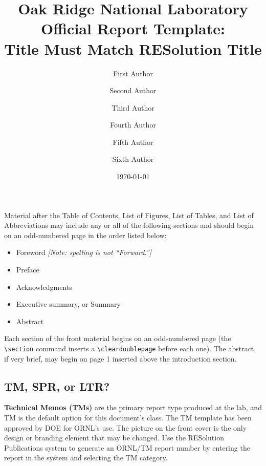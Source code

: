 \documentclass[tm]{ornltm} %
\author{First Author \and Second Author \and Third Author \and Fourth Author \and Fifth Author \and Sixth Author}
\title{Oak Ridge National Laboratory\\ Official Report Template:\\ Title Must Match RESolution Title}
\date{\today}
\renewcommand{\marginpar}[1]{{\small\em\color{note}[#1]}}
\begin{document}
\frontmatter

\tableofcontents %

\listoffigures %

\listoftables %

\printacronyms %

\begin{foreword} %

Material after the Table of Contents, List of Figures, List of Tables, and List of
Abbreviations may include any or all of the following sections and should begin
on an odd-numbered page in the order listed below:

\begin{itemize}
  \item Foreword \marginpar{Note: spelling is not ``Forward.''}
  \item Preface
  \item Acknowledgments
  \item Executive summary, or Summary
  \item Abstract
\end{itemize}

Each section of the front material begins on an odd-numbered page (the
\verb|\section| command inserts a \verb|\cleardoublepage| before each one). The
abstract, if very brief, may begin on page 1 inserted above the introduction
section.

\subsection*{TM, SPR, or LTR?}

\textbf{Technical Memos (TMs)} are the primary report type produced at the lab,
and TM is the default option for this document's class. The TM template has been
approved by DOE for ORNL's use. The picture on the front cover is the only
design or branding element that may be changed. Use the RESolution Publications
system to generate an ORNL/TM report number by entering the report in the system
and selecting the TM category.


\end{foreword}
\end{document}
